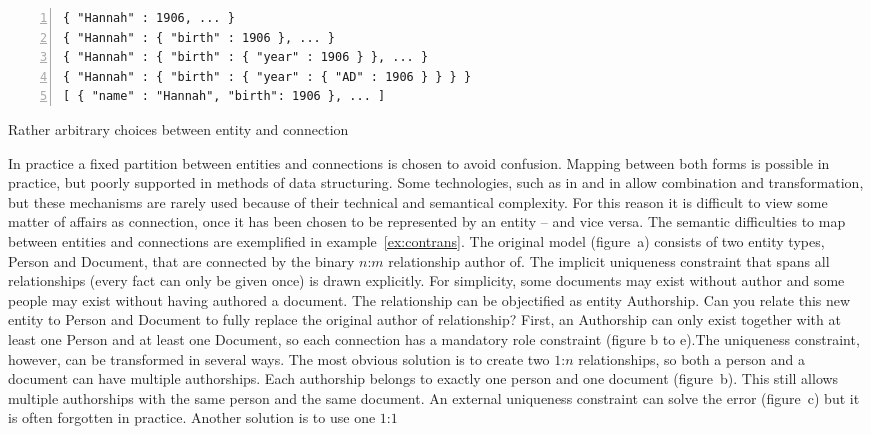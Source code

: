 \begin{example}
\begin{lstlisting}[numbers=left]
{ "Hannah" : 1906, ... }
{ "Hannah" : { "birth" : 1906 }, ... }
{ "Hannah" : { "birth" : { "year" : 1906 } }, ... }
{ "Hannah" : { "birth" : { "year" : { "AD" : 1906 } } } }
[ { "name" : "Hannah", "birth": 1906 }, ... ]
\end{lstlisting}
\caption{Rather arbitrary choices between entity and connection}
\label{ex:peopleborn}
\end{example}

In practice a fixed partition between entities and connections is chosen to
avoid confusion.  Mapping between both forms is possible in practice, but
poorly supported in methods of data structuring. Some technologies, such as
 in  and  in  allow
combination and transformation, but these mechanisms are rarely used because of
their technical and semantical complexity. For this reason it is difficult to
view some matter of affairs as connection, once it has been chosen to be
represented by an entity -- and vice versa.  The semantic difficulties to map
between entities and connections are exemplified in example~\ref{ex:contrans}.
The original model (figure~{\ormtext a}) consists of two entity types,
{\ormtext Person} and {\ormtext Document}, that are connected by the binary
$n$:$m$ relationship {\ormtext author of}. The implicit uniqueness constraint
that spans all relationships (every fact can only be given once) is drawn
explicitly. For simplicity, some documents may exist without author and some
people may exist without having authored a document. The relationship can be
objectified as entity {\ormtext Authorship}. Can you relate this new entity to
{\ormtext Person} and {\ormtext Document} to fully replace the original
{\ormtext author of} relationship? First, an {\ormtext Authorship} can only
exist together with at least one {\ormtext Person} and at least one {\ormtext
Document}, so each connection has a mandatory role constraint (figure {\ormtext
b} to {\ormtext e}).The uniqueness constraint, however, can be transformed in
several ways. The most obvious solution is to create two $1$:$n$ relationships,
so both a person and a document can have multiple authorships. Each authorship
belongs to exactly one person and one document (figure~{\ormtext b}).  This
still allows multiple authorships with the same person and the same document.
An external uniqueness constraint can solve the error (figure~{\ormtext c}) but
it is often forgotten in practice. Another solution is to use one $1$:$1$
